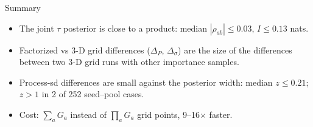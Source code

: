 \documentclass[aspectratio=169,14pt]{beamer}
\begin{document}
\begin{frame}{Summary}
  \begin{itemize}
    \item The joint $\tau$ posterior is close to a product: median $|\rho_{ab}| \le 0.03$, $I \le 0.13$ nats.
    \item Factorized vs 3-D grid differences ($\Delta_P$, $\Delta_\sigma$) are the size of the
          differences between two 3-D grid runs with other importance samples.
    \item Process-sd differences are small against the posterior width: median $z \le 0.21$;
          $z > 1$ in 2 of 252 seed--pool cases.
    \item Cost: $\sum_a G_a$ instead of $\prod_a G_a$ grid points, 9--16$\times$ faster.
  \end{itemize}
\end{frame}
\end{document}
